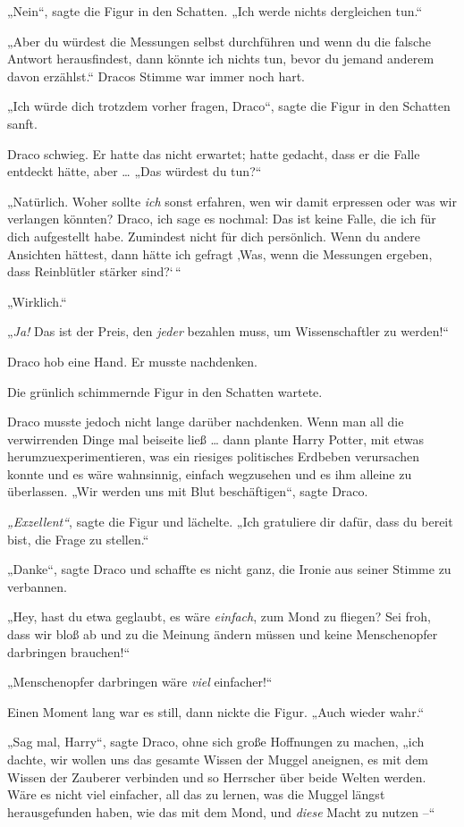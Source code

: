 {„Nein“, sagte die Figur in den Schatten. „Ich werde nichts dergleichen tun.“

„Aber du würdest die Messungen selbst durchführen und wenn du die falsche Antwort herausfindest, dann könnte ich nichts tun, bevor du jemand anderem davon erzählst.“ Dracos Stimme war immer noch hart.

„Ich würde dich trotzdem vorher fragen, Draco“, sagte die Figur in den Schatten sanft.

Draco schwieg. Er hatte das nicht erwartet; hatte gedacht, dass er die Falle entdeckt hätte, aber … „Das würdest du tun?“

„Natürlich. Woher sollte \emph{ich} sonst erfahren, wen wir damit erpressen oder was wir verlangen könnten? Draco, ich sage es nochmal: Das ist keine Falle, die ich für dich aufgestellt habe. Zumindest nicht für dich persönlich. Wenn du andere Ansichten hättest, dann hätte ich gefragt ‚Was, wenn die Messungen ergeben, dass Reinblütler stärker sind?`\,“

„Wirklich.“

„\emph{Ja!} Das ist der Preis, den \emph{jeder} bezahlen muss, um Wissenschaftler zu werden!“

Draco hob eine Hand. Er musste nachdenken.

Die grünlich schimmernde Figur in den Schatten wartete.

Draco musste jedoch nicht lange darüber nachdenken. Wenn man all die verwirrenden Dinge mal beiseite ließ … dann plante Harry Potter, mit etwas herumzuexperimentieren, was ein riesiges politisches Erdbeben verursachen konnte und es wäre wahnsinnig, einfach wegzusehen und es ihm alleine zu überlassen. „Wir werden uns mit Blut beschäftigen“, sagte Draco.

\emph{„Exzellent“}, sagte die Figur und lächelte. „Ich gratuliere dir dafür, dass du bereit bist, die Frage zu stellen.“

„Danke“, sagte Draco und schaffte es nicht ganz, die Ironie aus seiner Stimme zu verbannen.

„Hey, hast du etwa geglaubt, es wäre \emph{einfach}, zum Mond zu fliegen? Sei froh, dass wir bloß ab und zu die Meinung ändern müssen und keine Menschenopfer darbringen brauchen!“

„Menschenopfer darbringen wäre \emph{viel} einfacher!“

Einen Moment lang war es still, dann nickte die Figur. „Auch wieder wahr.“

„Sag mal, Harry“, sagte Draco, ohne sich große Hoffnungen zu machen, „ich dachte, wir wollen uns das gesamte Wissen der Muggel aneignen, es mit dem Wissen der Zauberer verbinden und so Herrscher über beide Welten werden. Wäre es nicht viel einfacher, all das zu lernen, was die Muggel längst herausgefunden haben, wie das mit dem Mond, und \emph{diese} Macht zu nutzen --“

}
